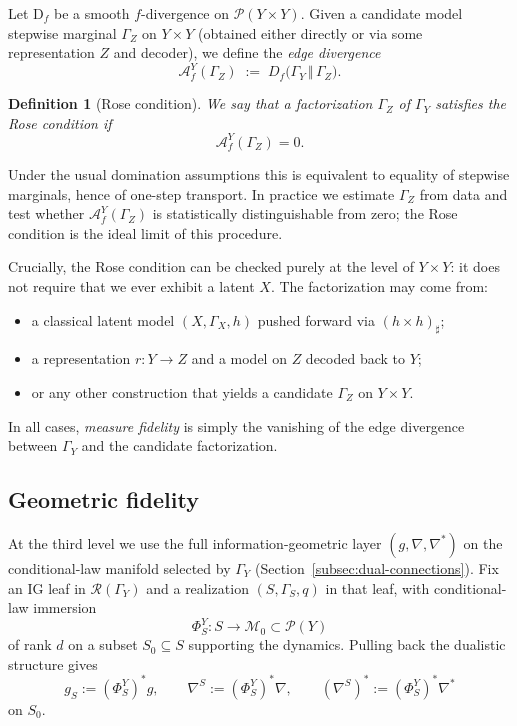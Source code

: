 \documentclass[11pt]{article}
\newtheorem{definition}{Definition}
\newcommand{\Df}{\mathrm{D}_f}
\newcommand{\1}{\mathbf{1}}
\begin{document}
Let $\Df$ be a smooth $f$-divergence on $\mathcal P(Y\times Y)$. Given a candidate model stepwise marginal $\Gamma_Z$ on $Y\times Y$ (obtained either directly or via some representation $Z$ and decoder), we define the \emph{edge divergence}
\[
  \mathcal A_f^Y(\Gamma_Z)
  \;:=\;
  D_f\bigl(\Gamma_Y \,\Vert\, \Gamma_Z\bigr).
\]

\begin{definition}[Rose condition]
We say that a factorization $\Gamma_Z$ of $\Gamma_Y$ satisfies the \emph{Rose condition} if
\[
  \mathcal A_f^Y(\Gamma_Z) = 0.
\]
\end{definition}

Under the usual domination assumptions this is equivalent to equality of stepwise marginals, hence of one-step transport. In practice we estimate $\Gamma_Z$ from data and test whether $\mathcal A_f^Y(\Gamma_Z)$ is statistically distinguishable from zero; the Rose condition is the ideal limit of this procedure.

Crucially, the Rose condition can be checked purely at the level of $Y\times Y$: it does not require that we ever exhibit a latent $X$. The factorization may come from:
\begin{itemize}[leftmargin=1.5em]
  \item a classical latent model $(X,\Gamma_X,h)$ pushed forward via $(h\times h)_{\sharp}$;
  \item a representation $r:Y\to Z$ and a model on $Z$ decoded back to $Y$;
  \item or any other construction that yields a candidate $\Gamma_Z$ on $Y\times Y$.
\end{itemize}

In all cases, \emph{measure fidelity} is simply the vanishing of the edge divergence between $\Gamma_Y$ and the candidate factorization.

\subsection{Geometric fidelity}

At the third level we use the full information-geometric layer $(g,\nabla,\nabla^\ast)$ on the conditional-law manifold selected by $\Gamma_Y$ (Section~\ref{subsec:dual-connections}). Fix an IG leaf in $\mathcal{R}(\Gamma_Y)$ and a realization $(S,\Gamma_S,q)$ in that leaf, with conditional-law immersion
\[
  \Phi_S^Y : S \longrightarrow \mathcal{M}_0 \subset \mathcal{P}(Y)
\]
of rank $d$ on a subset $S_0\subseteq S$ supporting the dynamics. Pulling back the dualistic structure gives
\[
  g_S := (\Phi_S^Y)^\ast g,
  \qquad
  \nabla^S := (\Phi_S^Y)^\ast \nabla,
  \qquad
  (\nabla^S)^\ast := (\Phi_S^Y)^\ast \nabla^\ast
\]
on $S_0$.
\end{document}
